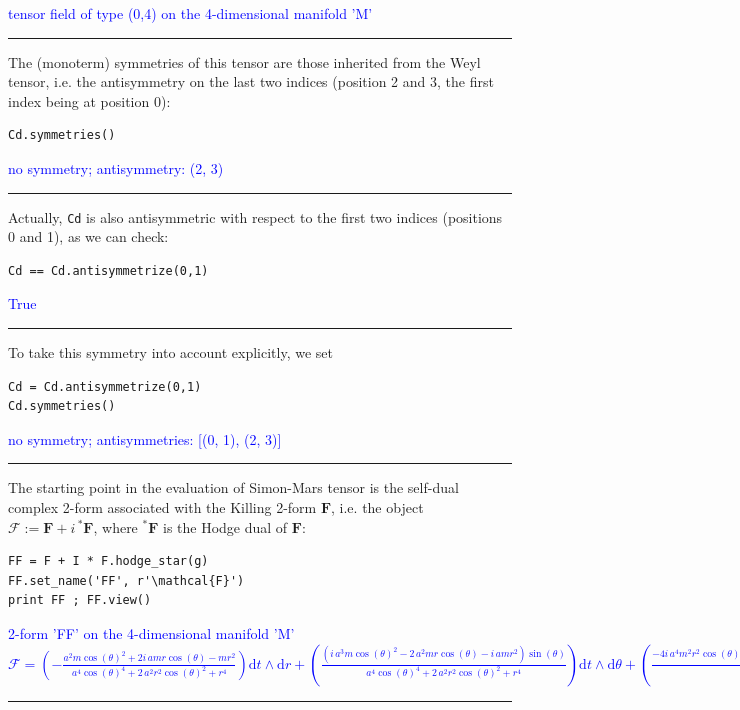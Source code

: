 \documentclass[a4paper]{jpconf}
\newcommand{\code}[1]{\texttt{#1}}
\newcommand{\w}[1]{\bm{#1}}
\newcommand{\soutput}[1]{\textcolor{blue}{#1}\\[-0.8ex]\rule{\textwidth}{0.4pt}}
\begin{document}
\soutput{tensor field of type (0,4) on the 4-dimensional manifold 'M'}
The (monoterm) symmetries of this tensor are those inherited from the
Weyl tensor, i.e. the antisymmetry on the last two indices (position 2 and 3, the first index being at position 0):
\begin{verbatim}
Cd.symmetries()
\end{verbatim}
\soutput{no symmetry;  antisymmetry: (2, 3)}
Actually, \code{Cd} is also antisymmetric with respect to the first two indices (positions 0 and 1), as we can check:
\begin{verbatim}
Cd == Cd.antisymmetrize(0,1)
\end{verbatim}
\soutput{True}
To take this symmetry into account explicitly, we set
\begin{verbatim}
Cd = Cd.antisymmetrize(0,1)
Cd.symmetries()
\end{verbatim}
\soutput{no symmetry;  antisymmetries: [(0, 1), (2, 3)]}
The starting point in the evaluation of Simon-Mars tensor is the
self-dual complex 2-form associated with the Killing 2-form $\w{F}$, i.e. the object
$\w{\mathcal{F}} := \w{F} + i \, {}^* \w{F}$, where ${}^*\w{F}$ is the Hodge dual of $\w{F}$:
\begin{verbatim}
FF = F + I * F.hodge_star(g)
FF.set_name('FF', r'\mathcal{F}')
print FF ; FF.view()
\end{verbatim}
\soutput{2-form 'FF' on the 4-dimensional manifold 'M'\\
$\mathcal{F} = \left( -\frac{a^{2} m \cos\left(\theta\right)^{2} + 2 i \,
a m r \cos\left(\theta\right) - m r^{2}}{a^{4}
\cos\left(\theta\right)^{4} + 2 \, a^{2} r^{2}
\cos\left(\theta\right)^{2} + r^{4}} \right) \mathrm{d} t\wedge
\mathrm{d} r + \left( \frac{{\left(i \, a^{3} m
\cos\left(\theta\right)^{2} - 2 \, a^{2} m r \cos\left(\theta\right) - i
\, a m r^{2}\right)} \sin\left(\theta\right)}{a^{4}
\cos\left(\theta\right)^{4} + 2 \, a^{2} r^{2}
\cos\left(\theta\right)^{2} + r^{4}} \right) \mathrm{d} t\wedge
\mathrm{d} \theta + \left( \frac{-4 i \, a^{4} m^{2} r^{2}
\cos\left(\theta\right) \sin\left(\theta\right)^{4} + {\left(a^{3} m
r^{4} - 2 \, a m^{2} r^{5} + a m r^{6} - {\left(a^{7} m - 2 \, a^{5}
m^{2} r + a^{5} m r^{2}\right)} \cos\left(\theta\right)^{4} - {\left(2 i
\, a^{6} m r + 2 i \, a^{4} m r^{3}\right)} \cos\left(\theta\right)^{3}
- {\left(-4 i \, a^{4} m^{2} r^{2} + 2 i \, a^{4} m r^{3} - 4 i \, a^{2}
m^{2} r^{4} + 2 i \, a^{2} m r^{5}\right)}
\cos\left(\theta\right)\right)} \sin\left(\theta\right)^{2}}{a^{2} r^{6}
- 2 \, m r^{7} + r^{8} + {\left(a^{8} - 2 \, a^{6} m r + a^{6}
r^{2}\right)} \cos\left(\theta\right)^{6} + 3 \, {\left(a^{6} r^{2} - 2
\, a^{4} m r^{3} + a^{4} r^{4}\right)} \cos\left(\theta\right)^{4} + 3
\, {\left(a^{4} r^{4} - 2 \, a^{2} m r^{5} + a^{2} r^{6}\right)}
\cos\left(\theta\right)^{2}} \right) \mathrm{d} r\wedge \mathrm{d} \phi
+ \left( -\frac{{\left(i \, a^{4} m + i \, a^{2} m r^{2}\right)}
\sin\left(\theta\right)^{3} + {\left(-i \, a^{4} m + i \, m r^{4} + 2 \,
{\left(a^{3} m r + a m r^{3}\right)} \cos\left(\theta\right)\right)}
\sin\left(\theta\right)}{a^{4} \cos\left(\theta\right)^{4} + 2 \, a^{2}
r^{2} \cos\left(\theta\right)^{2} + r^{4}} \right) \mathrm{d}
\theta\wedge \mathrm{d} \phi$}
\end{document}
